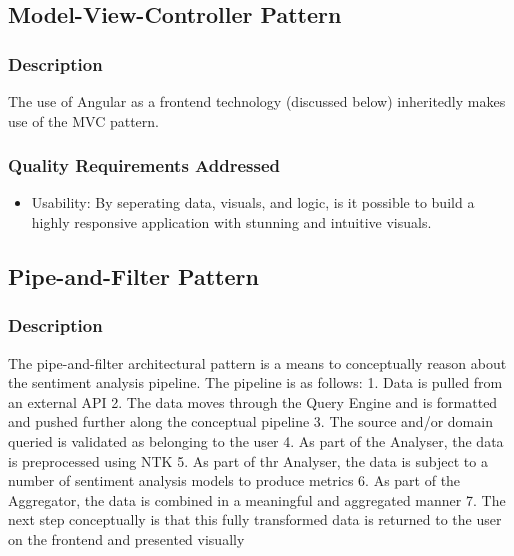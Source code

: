 \documentclass[12pt]{article}
\begin{document}
\subsection{Model-View-Controller Pattern}
\subsubsection{Description}
The use of Angular as a frontend technology (discussed below) inheritedly makes use of the MVC pattern.
\subsubsection{Quality Requirements Addressed}
\begin{itemize}
    \item Usability: By seperating data, visuals, and logic, is it possible to build a highly responsive application with stunning and intuitive visuals.
\end{itemize}
\subsection{Pipe-and-Filter Pattern}
\subsubsection{Description}
The pipe-and-filter architectural pattern is a means to conceptually reason about the sentiment analysis pipeline. The pipeline is as follows: 1. Data is pulled from an external API 2. The data moves through the Query Engine and is formatted and pushed further along the conceptual pipeline 3. The source and/or domain queried is validated as belonging to the user 4. As part of the Analyser, the data is preprocessed using NTK 5. As part of thr Analyser, the data is subject to a number of sentiment analysis models to produce metrics 6. As part of the Aggregator, the data is combined in a meaningful and aggregated manner 7. The next step conceptually is that this fully transformed data is returned to the user on the frontend and presented visually
\end{document}
